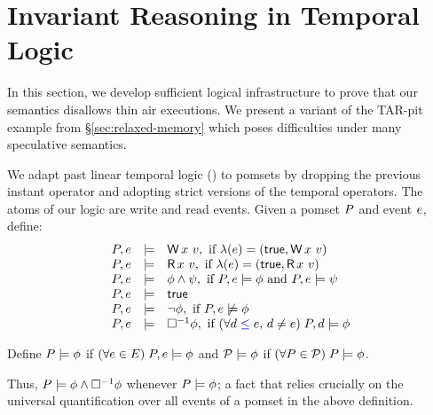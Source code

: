 \section{Invariant Reasoning in Temporal Logic}
\label{sec:logic}

In this section, we develop sufficient logical infrastructure to prove that
our semantics disallows thin air executions.  We present a variant of the
TAR-pit example from \S\ref{sec:relaxed-memory} which poses difficulties
under many speculative semantics.

We adapt past linear temporal logic (\pLTL)
\cite{Lichtenstein:1985:GP:648065.747612} to pomsets by dropping the previous
instant operator and adopting strict versions of the temporal operators.
The atoms of our logic are write and read events.
  Given a pomset $P$ and event $e$, define:
  \begin{displaymath}
    \begin{array}{lrl}
      \aPS,\aEv &\models& \DW{\aLoc}{\aVal}, \text{ if } \labeling(\aEv) =  (\TRUE, \DW{\aLoc}{\aVal}) \\
      \aPS,\aEv &\models& \DR{\aLoc}{\aVal}, \text{ if } \labeling(\aEv) =  (\TRUE, \DR{\aLoc}{\aVal}) \\
      \aPS,\aEv &\models& \afo\land\bfo, \text{ if } \aPS,\aEv \models  \afo \text{ and } \aPS,\aEv \models  \bfo \\
      \aPS,\aEv &\models& \TRUE\\
      \aPS,\aEv &\models& \lnot\afo, \text{ if } \aPS,\aEv \not\models \afo \\
      \aPS,\aEv &\models& \always\afo, \text{ if } (\forall \bEv \le \aEv,\,  \bEv\not=\aEv)\; \aPS,\bEv \models \afo
    \end{array} 
  \end{displaymath}

\begin{definition}
  Define $P \models \phi$ if
  $(\forall e \in E) \;P,e \models\phi$ and $\mathcal{P}\models \phi$
  if $(\forall P \in \mathcal{P})\; P \models\phi$.
\end{definition}
Thus, $P\models \phi \land \Box^{-1}\phi$ whenever $P \models \phi$; a fact that relies crucially on the universal quantification over all events of a pomset in the above definition.

